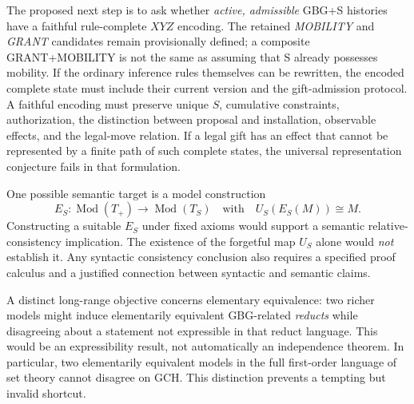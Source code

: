 \documentclass[11pt,letterpaper]{article}
\theoremstyle{definition}\newtheorem{definition}[theorem]{Definition}\newtheorem{example}[theorem]{Example}
\theoremstyle{remark}\newtheorem{remark}[theorem]{Remark}
\begin{document}
The proposed next step is to ask whether \emph{active, admissible} GBG+S histories have a faithful rule-complete $XYZ$ encoding. The retained \emph{MOBILITY} and \emph{GRANT} candidates remain provisionally defined; a composite GRANT+MOBILITY is not the same as assuming that S already possesses mobility. If the ordinary inference rules themselves can be rewritten, the encoded complete state must include their current version and the gift-admission protocol. A faithful encoding must preserve unique $S$, cumulative constraints, authorization, the distinction between proposal and installation, observable effects, and the legal-move relation. If a legal gift has an effect that cannot be represented by a finite path of such complete states, the universal representation conjecture fails in that formulation.

One possible semantic target is a model construction
\[
E_S:\operatorname{Mod}(T_+)\longrightarrow\operatorname{Mod}(T_S)
\quad\text{with}\quad
U_S(E_S(M))\cong M.
\]
Constructing a suitable $E_S$ under fixed axioms would support a semantic relative-consistency implication. The existence of the forgetful map $U_S$ alone would \emph{not} establish it. Any syntactic consistency conclusion also requires a specified proof calculus and a justified connection between syntactic and semantic claims.

A distinct long-range objective concerns elementary equivalence: two richer models might induce elementarily equivalent GBG-related \emph{reducts} while disagreeing about a statement not expressible in that reduct language. This would be an expressibility result, not automatically an independence theorem. In particular, two elementarily equivalent models in the full first-order language of set theory cannot disagree on GCH. This distinction prevents a tempting but invalid shortcut.
\end{document}

